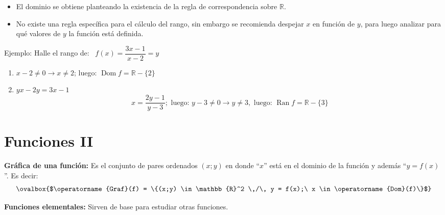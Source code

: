 \documentclass[11pt,a4paper]{article}
\begin{document}
\begin{itemize}
  \item El dominio se obtiene planteando la existencia de la regla de correspondencia
  sobre $\mathbb{R}$.
  \item No existe una regla específica para el cálculo del rango, sin embargo se recomienda
  despejar $x$ en función de $y$, para luego analizar para qué valores de $y$ la función
  está definida.
\end{itemize}

Ejemplo: Halle el rango de: \ $f(x) = \dfrac{3x - 1}{x - 2} = y$
\begin{enumerate}[label=\roman*)]
  \item $x - 2 \neq 0 \rightarrow x \neq 2$; luego: $\operatorname{Dom}f = \mathbb{R} - \{2\}$
  \item $yx - 2y = 3x - 1$
  \[x = \frac{2y - 1}{y - 3}; \text{ luego: } y - 3 \neq 0 \rightarrow y \neq 3, \text{ luego: } \operatorname{Ran}f = \mathbb{R} - \{3\}\]
\end{enumerate}


\newpage
\section{Funciones II}

\textbf{Gráfica de una función:} Es el conjunto de pares ordenados $(x;y)$ en donde ``$x$''
está en el dominio de la función y además ``$y = f(x)$''. Es decir:
\[\ovalbox{$\operatorname{Graf}(f) = \{(x;y) \in \mathbb{R}^2 \,/\, y = f(x);\ x \in \operatorname{Dom}(f)\}$}\]

\textbf{Funciones elementales:} Sirven de base para estudiar otras funciones.
\end{document}
